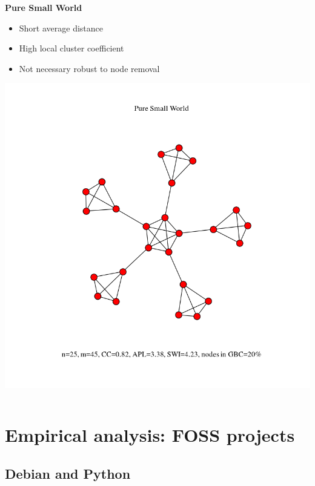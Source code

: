 \documentclass[ignorenonframetext,red,8pt,notes=show]{beamer}
\begin{document}
\begin{frame}
\begin{columns}[c]
\begin{column}{0.33\textwidth}
\begin{center}
\textbf{Pure Small World}
\end{center}
\begin{itemize}
\item Short average distance
\item High local cluster coefficient
\item Not necessary robust to node removal
\end{itemize}
\includegraphics[scale=0.2]{../../figures/model_small_world_25}
\end{column}
\end{columns}

\end{frame}


\section{Empirical analysis: FOSS projects}

\subsection{Debian and Python}
\end{document}
